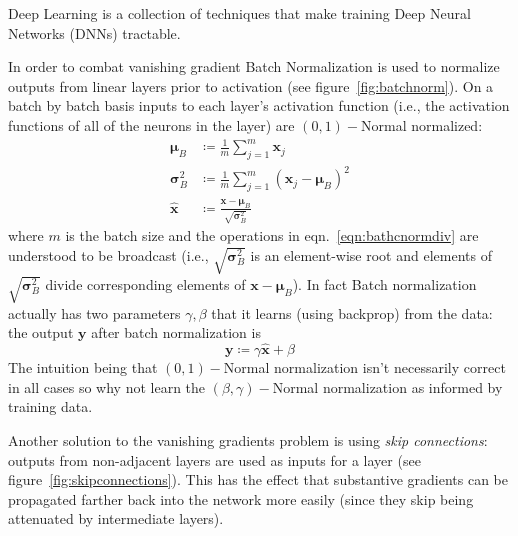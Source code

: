 Deep Learning is a collection of techniques that make training Deep Neural Networks (DNNs) tractable.
%


In order to combat vanishing gradient Batch Normalization\cite{ioffe2015batch} is used to normalize outputs from linear layers prior to activation (see figure~\ref{fig:batchnorm}).
%
On a batch by batch basis inputs to each layer's activation function (i.e., the activation functions of all of the neurons in the layer) are \((0,1)-\)Normal normalized:
\begin{align}
    \bm{\mu} _{B}        & \coloneqq {\frac {1}{m}}\sum _{j=1}^{m}\bm{x}_{j}                                             \\
    \bm{\sigma} _{B}^{2} & \coloneqq{\frac {1}{m}}\sum _{j=1}^{m}(\bm{x}_{j}-\bm{\mu}_{B})^{2}                           \\
    {\hat {\bm{x}}}      & \coloneqq {\frac {\bm{x}-\bm{\mu}_{B}}{\sqrt {\bm{\sigma}_{B}^{2}}}} \label{eqn:bathcnormdiv}
\end{align}
where \(m\) is the batch size and the operations in eqn.~\eqref{eqn:bathcnormdiv} are understood to be broadcast (i.e., \(\sqrt {\bm{\sigma} _{B}^{2}}\) is an element-wise root and elements of \(\sqrt {\bm{\sigma} _{B}^{2}}\) divide corresponding elements of \(\bm{x}-\bm{\mu}_{B}\)).
%
In fact Batch normalization actually has two parameters \(\gamma, \beta\) that it learns (using backprop) from the data: the output \(\bm{y}\) after batch normalization is
\begin{equation}
    \bm{y} \coloneqq \gamma \bm{\hat{x}} + \beta 
\end{equation}
The intuition being that \((0,1)-\)Normal normalization isn't necessarily correct in all cases so why not learn the \((\beta,\gamma)-\)Normal normalization as informed by training data.
%


Another solution to the vanishing gradients problem is using \textit{skip connections}: outputs from non-adjacent layers are used as inputs for a layer (see figure~\ref{fig:skipconnections}).
%
This has the effect that substantive gradients can be propagated farther back into the network more easily (since they skip being attenuated by intermediate layers).

